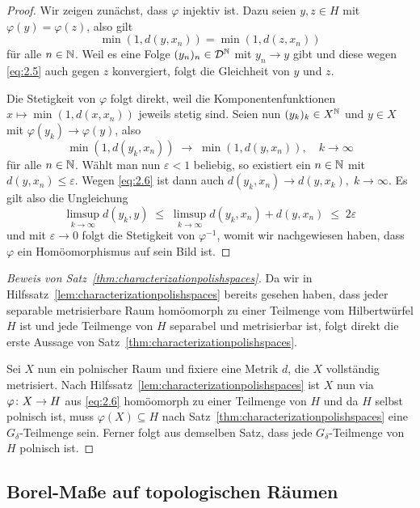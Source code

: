 \documentclass[../main/main.tex]{subfiles}
\begin{document}
	\begin{proof}
		Wir zeigen zunächst, dass $\varphi$ injektiv ist. 
		Dazu seien $y, z \in H$ mit $\varphi(y) = \varphi(z)$, also gilt
		\[\min(1, d(y, x_n)) = \min(1, d(z, x_n)) \label{eq:2.5} \tag{2.5}\]
		für alle $n \in \mathbb{N}$. Weil es eine Folge $(y_n)_n \in \mathcal{D}^{\mathbb{N}}$ mit 
		$y_n \to y$ gibt und diese wegen \eqref{eq:2.5} auch gegen $z$ 
		konvergiert, folgt die Gleichheit von $y$ und $z$.
		
		Die Stetigkeit von $\varphi$ folgt direkt, weil die 
		Komponentenfunktionen $x \mapsto \min(1, d(x, x_n))$ jeweils stetig sind. 
		Seien nun $(y_k)_k \in X^{\mathbb{N}}$ und $y \in X$ mit $\varphi(y_k) \to \varphi(y)$, 
		also
		\[\min(1, d(y_k, x_n)) \; \to \; \min(1, d(y, x_n)), 
		\quad k \to \infty \label{eq:2.6} \tag{2.6}\]
		für alle $n \in \mathbb{N}$. Wählt man nun $\varepsilon < 1$ beliebig, 
		so existiert ein $n \in \mathbb{N}$ mit $d(y, x_n) \leq \varepsilon$. 
		Wegen \eqref{eq:2.6} ist dann auch
		$d(y_k, x_n) \to d(y, x_k), \; k \to \infty$. Es gilt also die Ungleichung
		$$\limsup_{k \to \infty} d(y_k, y) \; \leq \; 
		\limsup_{k \to \infty} d(y_k, x_n) + d(y, x_n) \; \leq \; 2\varepsilon$$
		und mit $\varepsilon \to 0$ folgt die Stetigkeit von $\varphi^{-1}$, 
		womit wir nachgewiesen haben, dass $\varphi$ ein Homöomorphismus auf sein Bild ist. 
	\end{proof}

	\begin{proof}[Beweis von Satz~\ref{thm:characterizationpolishspaces}]
		Da wir in Hilfssatz~\ref{lem:characterizationpolishspaces} bereits 
		gesehen haben, dass jeder separable metrisierbare Raum homöomorph zu einer 
		Teilmenge vom Hilbertwürfel $H$ ist und jede Teilmenge von $H$ separabel und metrisierbar ist,
		folgt direkt die erste Aussage von Satz~\ref{thm:characterizationpolishspaces}. 
		
		Sei $X$ nun ein polnischer Raum und fixiere eine Metrik $d$, die $X$ vollständig metrisiert. 
		Nach Hilfssatz~\ref{lem:characterizationpolishspaces} ist $X$ nun via $\varphi \colon X \to H$ aus \eqref{eq:2.6}
		homöomorph zu einer Teilmenge von $H$ und da $H$ selbst polnisch ist, muss $\varphi(X) \subseteq H$ nach 
		Satz~\ref{thm:characterizationpolishspaces} eine $G_\delta$-Teilmenge sein.
		Ferner folgt aus demselben Satz, dass jede $G_\delta$-Teilmenge von $H$ polnisch ist.
	\end{proof}
	
	\subsection{Borel-Maße auf topologischen Räumen}
	
\end{document}
